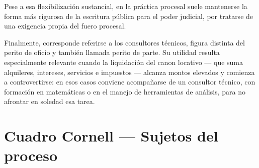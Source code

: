 \documentclass[12pt,oneside]{book}
\begin{document}
Pese a esa flexibilización sustancial, en la práctica procesal suele mantenerse la forma más rigurosa de la escritura pública para el poder judicial, por tratarse de una exigencia propia del fuero procesal.

Finalmente, corresponde referirse a los consultores técnicos, figura distinta del perito de oficio y también llamada perito de parte. Su utilidad resulta especialmente relevante cuando la liquidación del canon locativo --- que suma alquileres, intereses, servicios e impuestos --- alcanza montos elevados y comienza a controvertirse: en esos casos conviene acompañarse de un consultor técnico, con formación en matemáticas o en el manejo de herramientas de análisis, para no afrontar en soledad esa tarea.

\section*{Cuadro Cornell --- Sujetos del proceso}
\end{document}
